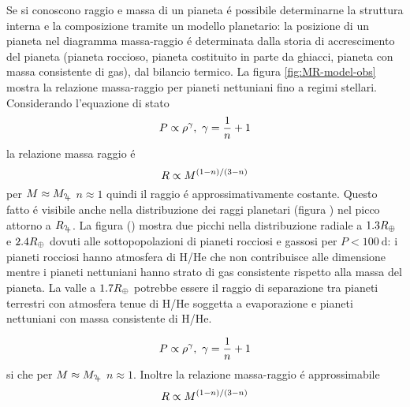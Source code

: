 Se si conoscono raggio e massa di un pianeta \'e possibile determinarne la struttura interna e la composizione tramite un modello planetario: la posizione di un pianeta nel diagramma massa-raggio \'e determinata dalla storia di accrescimento del pianeta (pianeta roccioso, pianeta costituito in parte da ghiacci, pianeta con massa consistente di gas), dal bilancio termico.
La figura \ref{fig:MR-model-obs} mostra la relazione massa-raggio per pianeti nettuniani fino a regimi stellari. Considerando l'equazione di stato
\begin{equation}
P\propto\rho\expy{\gamma},\ \gamma=\frac{1}{n}+1
\end{equation}
la relazione massa raggio \'e
\begin{equation}
R\propto M^{(1-n)/(3-n)}
\end{equation}
per $M\approx\mjupiter$ $n\approx1$ quindi il raggio \'e approssimativamente costante. Questo fatto \'e visibile anche nella distribuzione dei raggi planetari (figura ) nel picco attorno a $\rjupiter$.
La figura () mostra due picchi nella distribuzione radiale a $1.3R_{\oplus}{}$ e $2.4R_{\oplus}{}$ dovuti alle sottopopolazioni di pianeti rocciosi e gassosi per $P<\SI{100}{\day}$: i pianeti rocciosi hanno atmosfera di H/He che non contribuisce alle dimensione mentre i pianeti nettuniani hanno strato di gas consistente rispetto alla massa del pianeta. La valle a $1.7R_{\oplus}{}$ potrebbe essere il raggio di separazione tra pianeti terrestri con atmosfera tenue di H/He soggetta a evaporazione e pianeti nettuniani con massa consistente di H/He.


\begin{errata}
	\begin{equation}
	P\propto\rho\expy{\gamma},\ \gamma=\frac{1}{n}+1
	\end{equation}
	si che per $M\approx\mjupiter$ $n\approx1$.
	Inoltre la relazione massa-raggio  \'e approssimabile
	\begin{equation}
	R\propto M^{(1-n)/(3-n)}
	\end{equation}
\end{errata}


